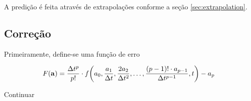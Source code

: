 A predição é feita através de extrapolações conforme a seção \ref{sec:extrapolation}.

\subsection{Correção}

Primeiramente, define-se uma função de erro

\begin{equation*}
  F\pqty{\vec{a}} = \dfrac{\Delta t^p}{p!}\cdot f\pqty{a_0, \dfrac{a_1}{\Dt}, \dfrac{2a_2}{\Dt^2},\dots,\dfrac{\pqty{p-1}!\cdot a_{p-1}}{\Dt^{p-1}}, t} - a_p
\end{equation*}

\alert{Continuar}
 